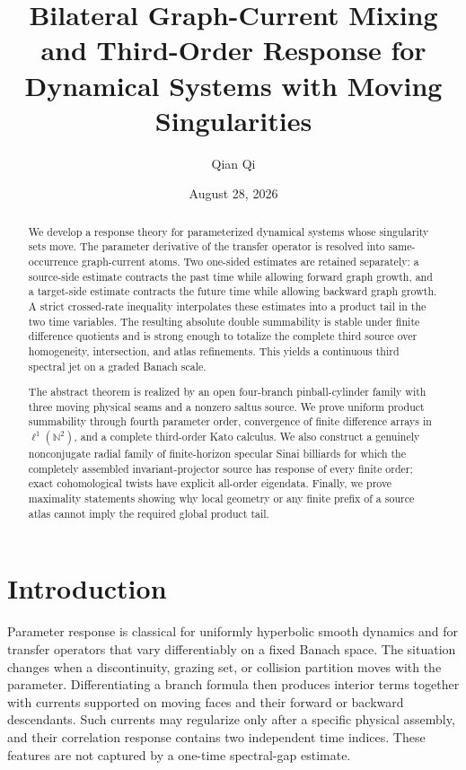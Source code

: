 \documentclass[11pt,reqno]{amsart}
\title[Bilateral graph-current mixing]{Bilateral Graph-Current Mixing and Third-Order Response for Dynamical Systems with Moving Singularities}
\author{Qian Qi}
\date{August 28, 2026}
\theoremstyle{definition}
\theoremstyle{remark}
\newcommand{\N}{\mathbb N}
\begin{document}
\begin{abstract}
We develop a response theory for parameterized dynamical systems whose
singularity sets move.  The parameter derivative of the transfer operator is
resolved into same-occurrence graph-current atoms.  Two one-sided estimates
are retained separately: a source-side estimate contracts the past time while
allowing forward graph growth, and a target-side estimate contracts the future
time while allowing backward graph growth.  A strict crossed-rate inequality
interpolates these estimates into a product tail in the two time variables.
The resulting absolute double summability is stable under finite difference
quotients and is strong enough to totalize the complete third source over
homogeneity, intersection, and atlas refinements.  This yields a continuous
third spectral jet on a graded Banach scale.

The abstract theorem is realized by an open four-branch pinball-cylinder
family with three moving physical seams and a nonzero saltus source.  We prove
uniform product summability through fourth parameter order, convergence of
finite difference arrays in $\ell^1(\N^2)$, and a complete third-order Kato
calculus.  We also construct a genuinely nonconjugate radial family of
finite-horizon specular Sinai billiards for which the completely assembled
invariant-projector source has response of every finite order; exact
cohomological twists have explicit all-order eigendata.  Finally, we prove
maximality statements showing why local geometry or any finite prefix of a
source atlas cannot imply the required global product tail.
\end{abstract}

\maketitle
\tableofcontents

\section{Introduction}

Parameter response is classical for uniformly hyperbolic smooth dynamics and
for transfer operators that vary differentiably on a fixed Banach space.  The
situation changes when a discontinuity, grazing set, or collision partition
moves with the parameter.  Differentiating a branch formula then produces
interior terms together with currents supported on moving faces and their
forward or backward descendants.  Such currents may regularize only after a
specific physical assembly, and their correlation response contains two
independent time indices.  These features are not captured by a one-time
spectral-gap estimate.
\end{document}
